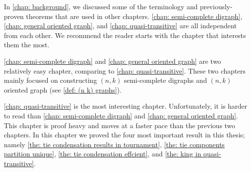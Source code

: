 In \cref{chap: background}, we discussed some of the terminology
and previously-proven theorems that are used in other chapters.
\cref{chap: semi-complete digraph}, \cref{chap: general oriented graph},
and \cref{chap: quasi-transitive} are all independent from each other.
We recommend the reader starts with the chapter that interests
them the most.

\cref{chap: semi-complete digraph} and \cref{chap: general oriented graph}
are two relatively easy chapter, comparing to \cref{chap: quasi-transitive}.
These two chapters mainly focused on constructing
\((n, k)\) semi-complete digraphs and
\((n, k)\) oriented graph (see \cref{def: (n k) graphs}).

\cref{chap: quasi-transitive} is the most interesting chapter.
Unfortunately, it is harder to read than
\cref{chap: semi-complete digraph} and \cref{chap: general oriented graph}.
This chapter is proof heavy and
moves at a faster pace than the previous two chapters.
In this chapter we proved the four most important result
in this thesis; namely
\cref{the: tie condensation results in tournament},
\cref{the: tie components partition unique},
\cref{the: tie condensation effcient},
and \cref{the: king in quasi-transitive}.
